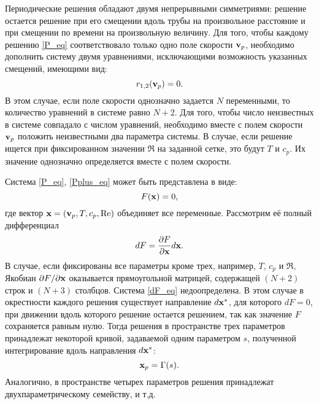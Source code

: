 Периодические решения обладают двумя непрерывными симметриями: решение остается решение при его смещении вдоль трубы на произвольное расстояние и при смещении по времени на произвольную величину. Для того, чтобы каждому решению \eqref{P_eq} соответствовало только одно поле скорости $\mathbf{v}_p$, необходимо дополнить систему двумя уравнениями, исключающими возможность указанных смещений, имеющими вид:
\begin{equation}\label{Pplus_eq}
r_{1,2}(\mathbf{v}_p) = 0.
\end{equation}
В этом случае, если поле скорости однозначно задается $N$ переменными, то количество уравнений в системе равно $N+2$. Для того, чтобы число неизвестных в системе совпадало с числом уравнений, необходимо вместе с полем скорости $\mathbf{v}_p$ положить неизвестными два параметра системы. В случае, если решение ищется при фиксированном значении $\Re$ на заданной сетке, это будут $T$ и $c_p$. Их значение однозначно определяется вместе с полем скорости.

Система \eqref{P_eq}, \eqref{Pplus_eq} может быть представлена в виде:
\begin{equation}\label{F_eq}
F(\mathbf{x}) = 0, 
\end{equation}
где вектор $\mathbf{x} = (\mathbf{v}_p, T, c_p, \operatorname{Re})$ объединяет все переменные. Рассмотрим её полный дифференциал
\begin{equation}\label{dF_eq}
dF = \frac{\partial F}{\partial \mathbf{x}}d\mathbf{x}.
\end{equation}
В случае, если фиксированы все параметры кроме трех, например, $T$, $c_p$ и $\Re$, Якобиан ${\partial F}/{\partial \mathbf{x}}$ оказывается прямоугольной матрицей, содержащей $(N+2)$ строк и $(N+3)$ столбцов. Система \eqref{dF_eq} недоопределена. В этом случае в окрестности каждого решения существует направление $d\mathbf{x}^*$, для которого $dF = 0$, при движении вдоль которого решение остается решением, так как значение $F$ сохраняется равным нулю. Тогда решения в пространстве трех параметров принадлежат некоторой кривой, задаваемой одним параметром $s$, полученной интегрирование вдоль направления $d\mathbf{x}^*$:
$$
\mathbf{x}_p = \Gamma(s).
$$ 
Аналогично, в пространстве четырех параметров решения принадлежат двухпараметрическому семейству, и т.д. 


